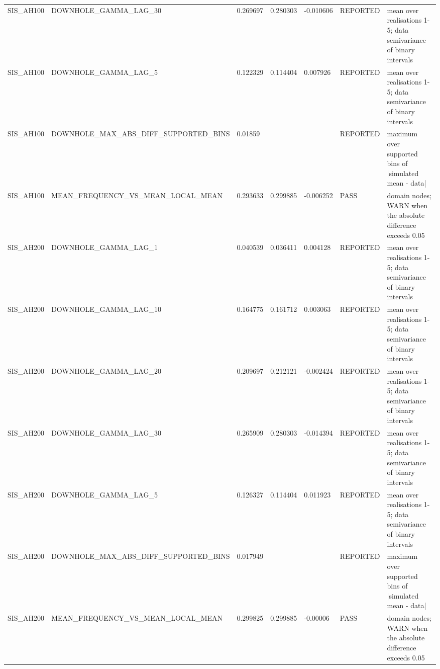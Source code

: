 \begin{table}[ht]
\begin{tabular}{lllllll}
SIS\_AH100 & DOWNHOLE\_GAMMA\_LAG\_30 & 0.269697 & 0.280303 & -0.010606 & REPORTED & mean over realisations 1-5; data semivariance of binary intervals \\
SIS\_AH100 & DOWNHOLE\_GAMMA\_LAG\_5 & 0.122329 & 0.114404 & 0.007926 & REPORTED & mean over realisations 1-5; data semivariance of binary intervals \\
SIS\_AH100 & DOWNHOLE\_MAX\_ABS\_DIFF\_SUPPORTED\_BINS & 0.01859 &  &  & REPORTED & maximum over supported bins of |simulated mean - data| \\
SIS\_AH100 & MEAN\_FREQUENCY\_VS\_MEAN\_LOCAL\_MEAN & 0.293633 & 0.299885 & -0.006252 & PASS & domain nodes; WARN when the absolute difference exceeds 0.05 \\
SIS\_AH200 & DOWNHOLE\_GAMMA\_LAG\_1 & 0.040539 & 0.036411 & 0.004128 & REPORTED & mean over realisations 1-5; data semivariance of binary intervals \\
SIS\_AH200 & DOWNHOLE\_GAMMA\_LAG\_10 & 0.164775 & 0.161712 & 0.003063 & REPORTED & mean over realisations 1-5; data semivariance of binary intervals \\
SIS\_AH200 & DOWNHOLE\_GAMMA\_LAG\_20 & 0.209697 & 0.212121 & -0.002424 & REPORTED & mean over realisations 1-5; data semivariance of binary intervals \\
SIS\_AH200 & DOWNHOLE\_GAMMA\_LAG\_30 & 0.265909 & 0.280303 & -0.014394 & REPORTED & mean over realisations 1-5; data semivariance of binary intervals \\
SIS\_AH200 & DOWNHOLE\_GAMMA\_LAG\_5 & 0.126327 & 0.114404 & 0.011923 & REPORTED & mean over realisations 1-5; data semivariance of binary intervals \\
SIS\_AH200 & DOWNHOLE\_MAX\_ABS\_DIFF\_SUPPORTED\_BINS & 0.017949 &  &  & REPORTED & maximum over supported bins of |simulated mean - data| \\
SIS\_AH200 & MEAN\_FREQUENCY\_VS\_MEAN\_LOCAL\_MEAN & 0.299825 & 0.299885 & -0.00006 & PASS & domain nodes; WARN when the absolute difference exceeds 0.05 \\
\bottomrule
\end{tabular}
\end{table}
